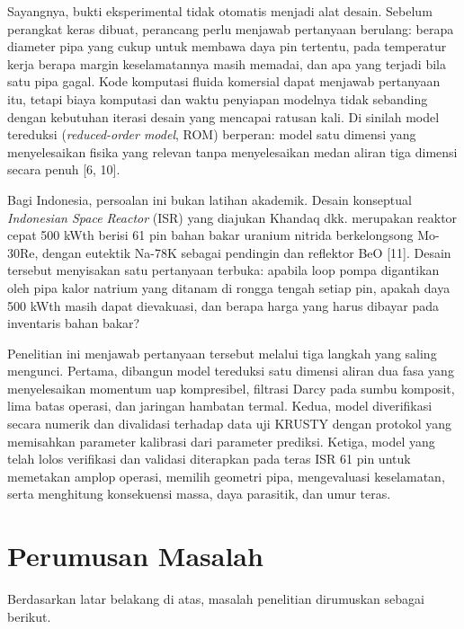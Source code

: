 \documentclass[
  indonesian,
  12pt,
  a4paper,
]{report}
\begin{document}
Sayangnya, bukti eksperimental tidak otomatis menjadi alat desain.
Sebelum perangkat keras dibuat, perancang perlu menjawab pertanyaan
berulang: berapa diameter pipa yang cukup untuk membawa daya pin
tertentu, pada temperatur kerja berapa margin keselamatannya masih
memadai, dan apa yang terjadi bila satu pipa gagal. Kode komputasi
fluida komersial dapat menjawab pertanyaan itu, tetapi biaya komputasi
dan waktu penyiapan modelnya tidak sebanding dengan kebutuhan iterasi
desain yang mencapai ratusan kali. Di sinilah model tereduksi
(\emph{reduced-order model}, ROM) berperan: model satu dimensi yang
menyelesaikan fisika yang relevan tanpa menyelesaikan medan aliran tiga
dimensi secara penuh {[}6, 10{]}.

Bagi Indonesia, persoalan ini bukan latihan akademik. Desain konseptual
\emph{Indonesian Space Reactor} (ISR) yang diajukan Khandaq dkk.
merupakan reaktor cepat 500 kWth berisi 61 pin bahan bakar uranium
nitrida berkelongsong Mo-30Re, dengan eutektik Na-78K sebagai pendingin
dan reflektor BeO {[}11{]}. Desain tersebut menyisakan satu pertanyaan
terbuka: apabila loop pompa digantikan oleh pipa kalor natrium yang
ditanam di rongga tengah setiap pin, apakah daya 500 kWth masih dapat
dievakuasi, dan berapa harga yang harus dibayar pada inventaris bahan
bakar?

Penelitian ini menjawab pertanyaan tersebut melalui tiga langkah yang
saling mengunci. Pertama, dibangun model tereduksi satu dimensi aliran
dua fasa yang menyelesaikan momentum uap kompresibel, filtrasi Darcy
pada sumbu komposit, lima batas operasi, dan jaringan hambatan termal.
Kedua, model diverifikasi secara numerik dan divalidasi terhadap data
uji KRUSTY dengan protokol yang memisahkan parameter kalibrasi dari
parameter prediksi. Ketiga, model yang telah lolos verifikasi dan
validasi diterapkan pada teras ISR 61 pin untuk memetakan amplop
operasi, memilih geometri pipa, mengevaluasi keselamatan, serta
menghitung konsekuensi massa, daya parasitik, dan umur teras.

\section{Perumusan Masalah}\label{perumusan-masalah}

Berdasarkan latar belakang di atas, masalah penelitian dirumuskan
sebagai berikut.
\end{document}
